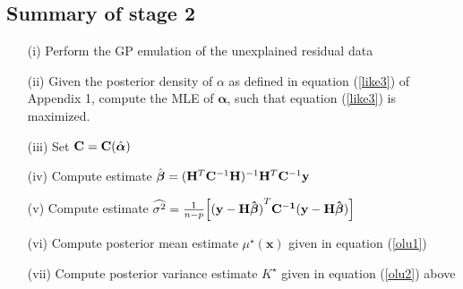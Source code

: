\documentclass[12pt,titlepage]{report}
\newcommand{\bH}{{\bf H}}
\newcommand{\bC}{{\bf C}}
\newcommand{\by}{{\bf y}}
\newcommand{\hbbeta}{{\hat{\boldsymbol{\beta}}}}
\newcommand{\balpha}{{\boldsymbol{\alpha}}}
\newcommand{\bhalpha}{{\hat{\boldsymbol{\alpha}}}}
\theoremstyle{definition}
\theoremstyle{remark}
\begin{document}
\subsection{Summary of stage 2}
\begin{itemize}
\item[{(i)}] Perform the GP emulation of the unexplained residual data 
\item[{(ii)}] Given the posterior density of $\alpha$ as defined in equation (\ref{like3}) of Appendix 1, compute the MLE of $\balpha$, such that equation (\ref{like3}) is maximized.
\item[{(iii)}] Set $\bC= \bC(\bhalpha)$
\item[{(iv)}] Compute estimate $\hbbeta=(\bH^T\bC^{-1}\bH)^{-1}\bH^T\bC^{-1}\by$
\item[{(v)}] Compute estimate $\widehat{\sigma^2}=\frac{1}{n-p}\Big[\mathbf{(y-H\hat{\boldsymbol \beta})}^T\bf C^{-1}(\bf y-H\hat{\boldsymbol \beta})\Big]$
\item[{(vi)}] Compute posterior mean estimate $\mu^{\star}(\mathbf{x})$ given in equation (\ref{olu1})
\item[{(vii)}] Compute posterior variance estimate $K^{\star}$ given in equation (\ref{olu2}) above
\end{itemize}
\end{document}
